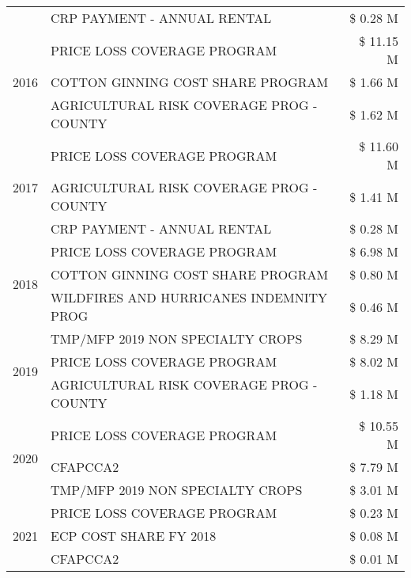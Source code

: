 \begin{tabular}{llr}
 & CRP PAYMENT - ANNUAL RENTAL & \$ 0.28 M \\
\cline{1-3}
\multirow[t]{3}{*}{2016} & PRICE LOSS COVERAGE PROGRAM                   & \$ 11.15 M \\
 & COTTON GINNING COST SHARE PROGRAM             & \$ 1.66 M \\
 & AGRICULTURAL RISK COVERAGE PROG - COUNTY      & \$ 1.62 M \\
\cline{1-3}
\multirow[t]{3}{*}{2017} & PRICE LOSS COVERAGE PROGRAM & \$ 11.60 M \\
 & AGRICULTURAL RISK COVERAGE PROG - COUNTY & \$ 1.41 M \\
 & CRP PAYMENT - ANNUAL RENTAL & \$ 0.28 M \\
\cline{1-3}
\multirow[t]{3}{*}{2018} & PRICE LOSS COVERAGE PROGRAM & \$ 6.98 M \\
 & COTTON GINNING COST SHARE PROGRAM & \$ 0.80 M \\
 & WILDFIRES AND HURRICANES INDEMNITY PROG & \$ 0.46 M \\
\cline{1-3}
\multirow[t]{3}{*}{2019} & TMP/MFP 2019 NON SPECIALTY CROPS & \$ 8.29 M \\
 & PRICE LOSS COVERAGE PROGRAM & \$ 8.02 M \\
 & AGRICULTURAL RISK COVERAGE PROG - COUNTY & \$ 1.18 M \\
\cline{1-3}
\multirow[t]{3}{*}{2020} & PRICE LOSS COVERAGE PROGRAM & \$ 10.55 M \\
 & CFAPCCA2 & \$ 7.79 M \\
 & TMP/MFP 2019 NON SPECIALTY CROPS & \$ 3.01 M \\
\cline{1-3}
\multirow[t]{3}{*}{2021} & PRICE LOSS COVERAGE PROGRAM & \$ 0.23 M \\
 & ECP COST SHARE FY 2018 & \$ 0.08 M \\
 & CFAPCCA2 & \$ 0.01 M \\
\cline{1-3}
\bottomrule
\end{tabular}
